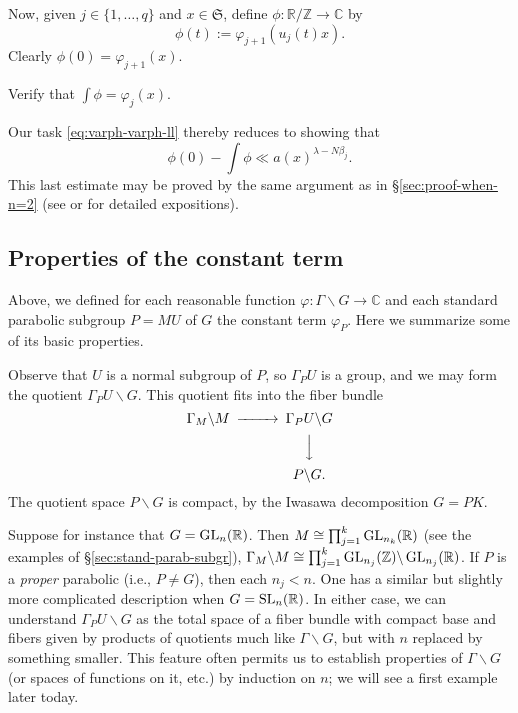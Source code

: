 \documentclass[reqno]{amsart} 
\begin{document}
Now, given $j \in \{1, \dotsc, q\}$ and $x \in \mathfrak{S}$,
define
$\phi : \mathbb{R}/\mathbb{Z} \rightarrow \mathbb{C}$
by
\begin{equation*}
  \phi(t) := \varphi_{j+1}(u_j(t) x).
\end{equation*}
Clearly $\phi(0) = \varphi_{j+1}(x)$.
\begin{exercise}
  Verify that
  $\int \phi = \varphi_{j}(x)$.
\end{exercise}
Our task \eqref{eq:varph-varph-ll} thereby reduces to showing that
\begin{equation}\label{eq:phi0-int-phi-1}
  \phi(0) - \int \phi \ll a(x)^{\lambda - N \beta_j}.
\end{equation}
This last estimate may be proved by the same argument as in \S\ref{sec:proof-when-n=2} (see \cite[\S6.7]{MR2331343} or \cite[\S I.2.10]{MR1361168} for detailed expositions).

\subsection{Properties of the constant term}
Above, we defined for each reasonable function $\varphi : \Gamma \backslash G \rightarrow \mathbb{C}$ and each standard parabolic subgroup $P = M U$ of $G$ the constant term $\varphi _P$.  Here we summarize some of its basic properties.

Observe that $U$ is a normal subgroup of $P$, so $\Gamma_P U$ is a group, and we may form the quotient $\Gamma_P U \backslash G$.  This quotient fits into the fiber bundle
\begin{equation*}
  \begin{CD}         
    \Gamma_M \backslash M @>>> \Gamma_P U \backslash G \\
    @.  @VVV \\
    @. P \backslash G. \\
  \end{CD}
\end{equation*}
The quotient space $P \backslash G$ is compact, by the Iwasawa decomposition $G = P K$.

Suppose for instance that $G = \operatorname{GL}_n(\mathbb{R})$.  Then $M \cong \prod_{j=1}^k \operatorname{GL}_{n_k}(\mathbb{R})$ (see the examples of \S\ref{sec:stand-parab-subgr}), $\Gamma_M \backslash M \cong \prod_{j=1}^k \operatorname{GL}_{n_j}(\mathbb{Z}) \backslash \operatorname{GL}_{n_j}(\mathbb{R})$.  If $P$ is a \emph{proper} parabolic (i.e., $P \neq G$), then each $n_j < n$.  One has a similar but slightly more complicated description when $G = \operatorname{SL}_n(\mathbb{R})$.  In either case, we can understand $\Gamma_P U \backslash G$ as the total space of a fiber bundle with compact base and fibers given by products of quotients much like $\Gamma \backslash G$, but with $n$ replaced by something smaller.  This feature often permits us to establish properties of $\Gamma \backslash G$ (or spaces of functions on it, etc.) by induction on $n$; we will see a first example later today.
\end{document}
